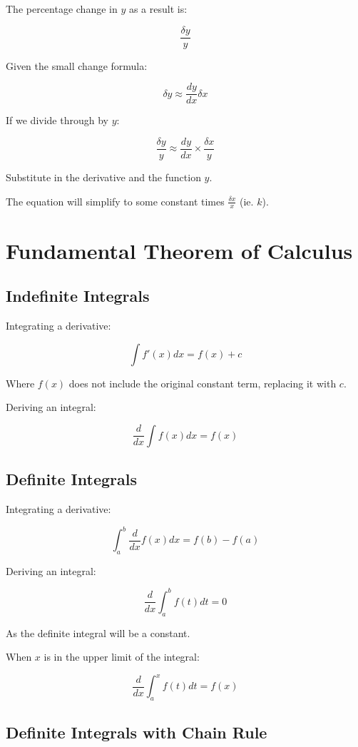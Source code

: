 \documentclass[a4paper,11pt]{article}
\begin{document}
The percentage change in $y$ as a result is:

$$
\frac{\delta y}{y}
$$

Given the small change formula:

$$
\delta y \approx \frac{dy}{dx} \delta x
$$

If we divide through by $y$:

$$
\frac{\delta y}{y} \approx \frac{dy}{dx} \times \frac{\delta x}{y}
$$

Substitute in the derivative and the function $y$.

The equation will simplify to some constant times $\frac{\delta x}{x}$
(ie. $k$).



\section{Fundamental Theorem of Calculus}

\subsection{Indefinite Integrals}

Integrating a derivative:

$$
\int f'(x) dx = f(x) + c
$$

Where $f(x)$ does not include the original constant term, replacing it with $c$.

Deriving an integral:

$$
\frac{d}{dx} \int f(x) dx = f(x)
$$


\subsection{Definite Integrals}

Integrating a derivative:

$$
\int_a^b \frac{d}{dx} f(x) dx = f(b) - f(a)
$$

Deriving an integral:

$$
\frac{d}{dx} \int_a^b f(t) dt = 0
$$

As the definite integral will be a constant.

When $x$ is in the upper limit of the integral:

$$
\frac{d}{dx} \int_a^x f(t) dt = f(x)
$$


\subsection{Definite Integrals with Chain Rule}
\end{document}
